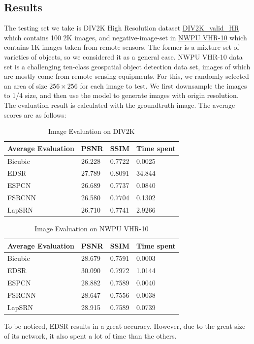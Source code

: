 \documentclass{article}
\begin{document}
  \subsection{Results}
  The testing set we take is DIV2K High Resolution dataset \href{https://data.vision.ee.ethz.ch/cvl/DIV2K}{DIV2K\_valid\_HR} 
  which contains 100 2K images, and negative-image-set in \href{https://hyper.ai/datasets/5422}{NWPU VHR-10} which contains 1K images taken from remote sensors.
  The former is a mixture set of varieties of objects, so we considered it as a general case.
  NWPU VHR-10 data set is a challenging ten-class geospatial object detection data set, images of which are mostly come from remote sensing equipments. 
  For this, we randomly selected an area of size $256\times 256$ for each image to test.
  We first downsample the images to 1/4 size, and then use the model to generate images with origin resolution.
  The evaluation result is calculated with the groundtruth image.
  The average scores are as follows:
  \begin{table}[H]
      \centering
      \caption{Image Evaluation on DIV2K}
      \begin{tabular}{|l|l|l|l|}
      \hline
      Average Evaluation  & PSNR   & SSIM   & Time spent  \\ \hline
      Bicubic             & 26.228 & 0.7722 & 0.0025      \\ \hline
      EDSR                & 27.789 & 0.8091 & 34.844      \\ \hline
      ESPCN               & 26.689 & 0.7737 & 0.0840      \\ \hline
      FSRCNN              & 26.580 & 0.7704 & 0.1302      \\ \hline
      LapSRN              & 26.710 & 0.7741 & 2.9266      \\ \hline
      \end{tabular}
  \end{table}
  \begin{table}[H]
      \centering
      \caption{Image Evaluation on NWPU VHR-10}
      \begin{tabular}{|l|l|l|l|}
      \hline
      Average Evaluation  & PSNR   & SSIM   & Time spent  \\ \hline
      Bicubic             & 28.679 & 0.7591 & 0.0003      \\ \hline
      EDSR                & 30.090 & 0.7972 & 1.0144      \\ \hline
      ESPCN               & 28.882 & 0.7589 & 0.0040      \\ \hline
      FSRCNN              & 28.647 & 0.7556 & 0.0038      \\ \hline
      LapSRN              & 28.915 & 0.7589 & 0.0739      \\ \hline
      \end{tabular}
  \end{table}
  To be noticed, EDSR results in a great accuracy. 
  However, due to the great size of its network, it also spent a lot of time than the others.
  
\end{document}
